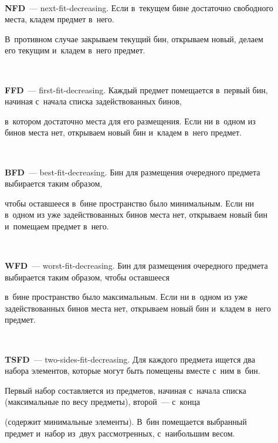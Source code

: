 \begin{description}

\item[\,] 

\textbf{NFD}~--- next-fit-decreasing. Если в~текущем бине достаточно свободного мес\-та,  кладем пред\-мет в~него. 

В~противном случае  за\-кры\-ва\-ем текущий бин, открываем новый, делаем его текущим и~кладем в~него предмет.



\item[\,]

\textbf{FFD}~--- first-fit-decreasing. Каждый пред\-мет помещается в~первый бин, начиная с~начала списка задействованных би\-нов, 

в~котором до\-ста\-точ\-но мес\-та для его размещения. Если ни в~одном из би\-нов мес\-та нет, открываем новый бин и~кладем в~него пред\-мет.



\item[\,]

\textbf{BFD}~--- best-fit-decreasing. Бин для размещения очередного пред\-ме\-та выбирается таким образом,

 чтобы остав\-ше\-еся в~бине пространство было минимальным. Если ни в~одном из уже задействованных би\-нов мес\-та нет, открываем новый бин и~помещаем пред\-мет в~него.



\item[\,]

\textbf{WFD}~--- worst-fit-decreasing. Бин для размещения очередного пред\-ме\-та выбирается таким образом, чтобы остав\-ше\-еся 

в~би\-не пространство было максимальным. Если ни в~одном из уже задействованных бинов мес\-та нет, открываем новый бин и~кладем в~него пред\-мет.



\item[\,]

\textbf{TSFD}~--- two-sides-fit-decreasing. Для каждого предмета ищется два набора элементов, которые могут быть помещены вместе с~ним в~бин. 

Первый набор со\-став\-ля\-ет\-ся из предметов, начиная с~начала спис\-ка (максимальные по весу предметы), второй~--- с~кон\-ца 

(содержит минимальные элементы). В~бин помещается выбранный предмет и~набор из~двух рас\-смот\-рен\-ных, с~наибольшим весом.

\end{description}



